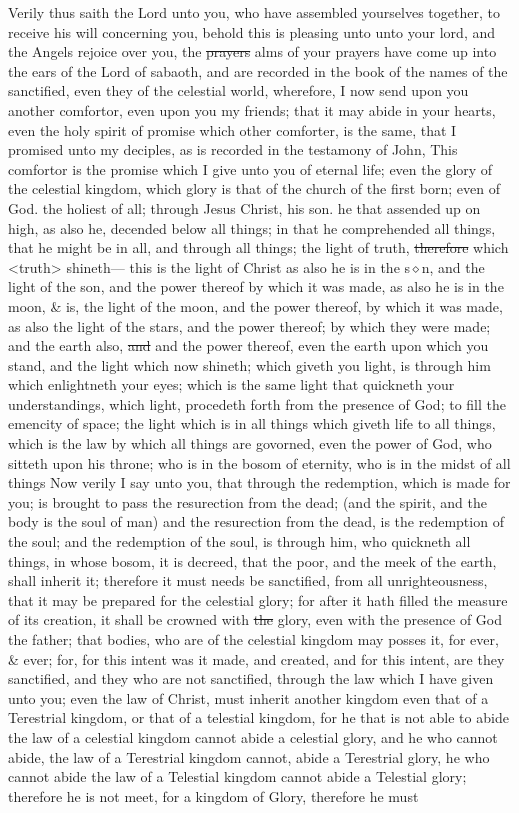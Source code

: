 				Verily thus saith the Lord unto you, who have assembled yourselves together, to receive his will concerning you, behold this is pleasing unto unto your lord, and the Angels rejoice over you, the \sout{prayers} alms of your prayers have come up into the ears of the Lord of sabaoth, and are recorded in the book of the names of the sanctified, even they of the celestial world, wherefore, I now send upon you another comfortor, even upon you my friends; that it may abide in your hearts, even the holy spirit of promise which other comforter, is the same, that I promised unto my deciples, as is recorded in the testamony of John, This comfortor is the promise which I give unto you of eternal life; even the glory of the celestial kingdom, which glory is that of the church of the first born; even of God. the holiest of all; through Jesus Christ, his son. he that assended up on high, as also he, decended below all things; in that he comprehended all things, that he might be in all, and through all things; the light of truth, \sout{therefore} which <truth> shineth--- this is the light of Christ as also he is in the s$\diamond$n, and the light of the son, and the power thereof by which it was made, as also he is in the moon, \& is, the light of the moon, and the power thereof, by which it was made, as also the light of the stars, and the power thereof; by which they were made; and the earth also, \sout{and} and the power thereof, even the earth upon which you stand, and the light which now shineth; which giveth you light, is through him which enlightneth your eyes; which is the same light that quickneth your understandings, which light, procedeth forth from the presence of God; to fill the emencity of space; the light which is in all things which giveth life to all things, which is the law by which all things are govorned, even the power of God, who sitteth upon his throne; who is in the bosom of eternity, who is in the midst of all things Now verily I say unto you, that through the redemption, which is made for you; is brought to pass the resurection from the dead; (and the spirit, and the body is the soul of man) and the resurection from the dead, is the redemption of the soul; and the redemption of the soul, is through him, who quickneth all things, in whose bosom, it is decreed, that the poor, and the meek of the earth, shall inherit it; therefore it must needs be sanctified, from all unrighteousness, that it may be prepared for the celestial glory; for after it hath filled the measure of its creation, it shall be crowned with \sout{the} glory, even with the presence of God the father; that bodies, who are of the celestial kingdom may posses it, for ever, \& ever; for, for this intent was it made, and created, and for this intent, are they sanctified, and they who are not sanctified, through the law which I have given unto you; even the law of Christ, must inherit another kingdom even that of a Terestrial kingdom, or that of a telestial kingdom, for he that is not able to abide the law of a celestial kingdom cannot abide a celestial glory, and he who cannot abide, the law of a Terestrial kingdom cannot, abide a Terestrial glory, he who cannot abide the law of a Telestial kingdom cannot abide a Telestial glory; therefore he is not meet, for a kingdom of Glory, therefore he must 